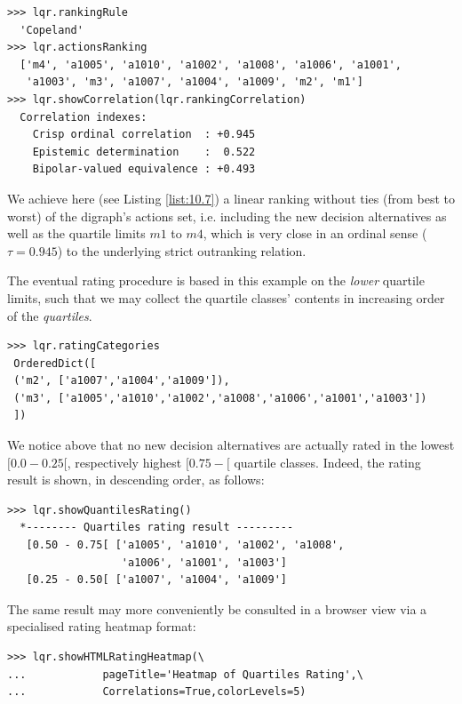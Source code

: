 \begin{lstlisting}[caption={\Copeland ranking of new alternatives and historical quartile limits},label=list:10.7]
>>> lqr.rankingRule
  'Copeland'
>>> lqr.actionsRanking
  ['m4', 'a1005', 'a1010', 'a1002', 'a1008', 'a1006', 'a1001',
   'a1003', 'm3', 'a1007', 'a1004', 'a1009', 'm2', 'm1'] 
>>> lqr.showCorrelation(lqr.rankingCorrelation)
  Correlation indexes:
    Crisp ordinal correlation  : +0.945
    Epistemic determination    :  0.522
    Bipolar-valued equivalence : +0.493
\end{lstlisting}

We achieve here (see Listing \ref{list:10.7}) a linear ranking without ties (from best to worst) of the digraph's actions set, i.e. including the new decision alternatives as well as the quartile limits $m1$ to $m4$, which is very close in an ordinal sense ($\tau = 0.945$) to the underlying strict outranking relation.

The eventual rating procedure is based in this example on the \emph{lower} quartile limits, such that we may collect the quartile classes' contents in increasing order of the \emph{quartiles}.

\begin{lstlisting}
>>> lqr.ratingCategories
 OrderedDict([
 ('m2', ['a1007','a1004','a1009']),
 ('m3', ['a1005','a1010','a1002','a1008','a1006','a1001','a1003'])
 ])
\end{lstlisting}    

We notice above that no new decision alternatives are actually rated in the lowest $[0.0-0.25[$, respectively highest $[0.75- [$ quartile classes. Indeed, the rating result is shown, in descending order, as follows:

\begin{lstlisting}[caption={Absolute quartiles rating result},label=list:10.8]
>>> lqr.showQuantilesRating()
  *-------- Quartiles rating result ---------
   [0.50 - 0.75[ ['a1005', 'a1010', 'a1002', 'a1008',
                  'a1006', 'a1001', 'a1003']
   [0.25 - 0.50[ ['a1007', 'a1004', 'a1009']
\end{lstlisting}    

The same result may more conveniently be consulted in a browser view via a specialised rating heatmap format: 

\begin{lstlisting}
>>> lqr.showHTMLRatingHeatmap(\
...            pageTitle='Heatmap of Quartiles Rating',\
...            Correlations=True,colorLevels=5)
\end{lstlisting}

